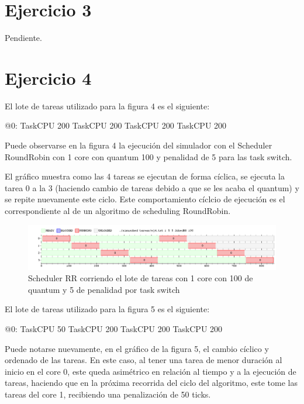\documentclass[a4paper,10pt,twoside]{article}
\newenvironment{pseudo}[1][]{%
    \vspace{0.5em}%
    \begin{algorithmic}%
}
{%
    \end{algorithmic}%
    \vspace{0.5em}%
}
\begin{document}
\section{Ejercicio 3}

Pendiente.




\section{Ejercicio 4}
El lote de tareas utilizado para la figura 4 es el siguiente:
\begin{pseudo}
	\State @0:
	\State TaskCPU 200
	\State TaskCPU 200
	\State TaskCPU 200
	\State TaskCPU 200
\end{pseudo}

Puede observarse en la figura 4 la ejecución del simulador con el Scheduler RoundRobin con 1 core con quantum 100 y penalidad de 5 para las task switch.

El gráfico muestra como las 4 tareas se ejecutan de forma cíclica, se ejecuta la tarea 0 a la 3 (haciendo cambio de tareas debido a que se les acaba el quantum) y se repite nuevamente este ciclo. Este comportamiento cíclcio de ejecución es el correspondiente al de un algoritmo de scheduling RoundRobin.

\begin{figure}[ht!]
\centering
\includegraphics[width=175mm]{../ejercicio4/SchedRR1Core.png}
\caption{Scheduler RR corriendo el lote de tareas con 1 core con 100 de quantum y 5 de penalidad por task switch}
\label{overflow}
\end{figure}

El lote de tareas utilizado para la figura 5 es el siguiente:
\begin{pseudo}
	\State @0:
	\State TaskCPU 50
	\State TaskCPU 200
	\State TaskCPU 200
	\State TaskCPU 200
\end{pseudo}

Puede notarse nuevamente, en el gráfico de la figura 5, el cambio cíclico y ordenado de las tareas. En este caso, al tener una tarea de menor duración al inicio en el core 0, este queda asimétrico en relación al tiempo y a la ejecución de tareas, haciendo que en la próxima recorrida del ciclo del algoritmo, este tome las tareas del core 1, recibiendo una penalización de 50 ticks.
\end{document}
